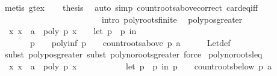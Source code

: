 \begin{isabellebody}
\ {\isacharparenleft}metis\ gt{\isacharunderscore}ex{\isacharparenright}\isanewline
\ \ \isamarkupfalse%
\ {\isacharquery}thesis\ \isamarkupfalse%
\ {\isacharparenleft}auto\ simp{\isacharcolon}\ count{\isacharunderscore}roots{\isacharunderscore}above{\isacharunderscore}correct\ card{\isacharunderscore}eq{\isacharunderscore}{}{\isacharunderscore}iff\isanewline
\ \ \ \ \ \ \ \ \ \ \ \ \ \ \ \ \ \ \ \ \ \ \ \ intro{\isacharcolon}\ poly{\isacharunderscore}roots{\isacharunderscore}finite\ {\isacharparenright}\isanewline
{}\isamarkupfalse%
%
\endisatagproof
{\isafoldproof}%
%
\isadelimproof
\isanewline
%
\endisadelimproof
\isanewline
{}\isamarkupfalse%
\ poly{\isacharunderscore}pos{\isacharunderscore}greater{\isacharcolon}\isanewline
\ \ {\isachardoublequoteopen}{\isacharparenleft}{\isasymforall}x{\isachardot}\ x\ {\isachargreater}\ a\ {\isasymlongrightarrow}\ poly\ p\ x\ {\isachargreater}\ {}{\isacharparenright}\ {\isasymlongleftrightarrow}\ {\isacharparenleft}let\ p\ {\isacharequal}\ p\ in\isanewline
\ \ \ \ \ \ \ p\ {\isasymnoteq}\ {}\ {\isasymand}\ poly{\isacharunderscore}inf\ p\ {\isacharequal}\ {}\ {\isasymand}\ count{\isacharunderscore}roots{\isacharunderscore}above\ p\ a\ {\isacharequal}\ {}{\isacharparenright}{\isachardoublequoteclose}\isanewline
%
\isadelimproof
\ \ %
\endisadelimproof
%
\isatagproof
{}\isamarkupfalse%
\ Let{\isacharunderscore}def\isanewline
\ \ \isamarkupfalse%
\ {\isacharparenleft}subst\ poly{\isacharunderscore}pos{\isacharunderscore}greater{\isacharcomma}\ subst\ poly{\isacharunderscore}no{\isacharunderscore}roots{\isacharunderscore}greater{\isacharcomma}\ force{\isacharparenright}%
\endisatagproof
{\isafoldproof}%
%
\isadelimproof
\isanewline
%
\endisadelimproof
\isanewline
{}\isamarkupfalse%
\ poly{\isacharunderscore}no{\isacharunderscore}roots{\isacharunderscore}leq{\isacharcolon}\isanewline
\ \ {\isachardoublequoteopen}{\isacharparenleft}{\isasymforall}x{\isachardot}\ x\ {\isasymle}\ a\ {\isasymlongrightarrow}\ poly\ p\ x\ {\isasymnoteq}\ {}{\isacharparenright}\ {\isasymlongleftrightarrow}\ \isanewline
\ \ \ \ \ \ \ {\isacharparenleft}let\ p\ {\isacharequal}\ p\ in\ {\isacharparenleft}p\ {\isasymnoteq}\ {}\ {\isasymand}\ count{\isacharunderscore}roots{\isacharunderscore}below\ p\ a\ {\isacharequal}\ {}{\isacharparenright}{\isacharparenright}{\isachardoublequoteclose}\isanewline
%
\isadelimproof
\ \ \ \ %
\endisadelimproof

\end{isabellebody}
